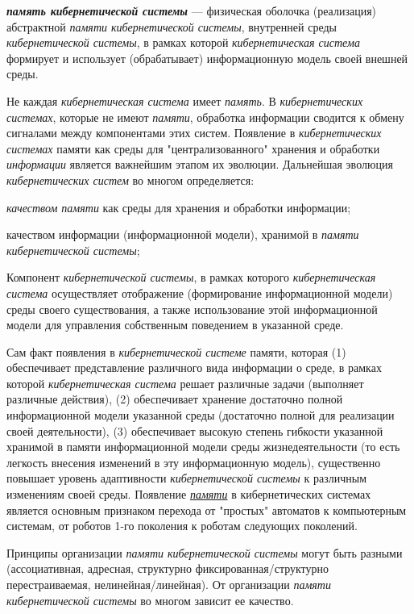 \textbf{\textit{память кибернетической системы}} --- физическая оболочка (реализация) абстрактной \textit{памяти кибернетической системы}, внутренней среды \textit{кибернетической системы}, в рамках которой \textit{кибернетическая система} формирует и использует (обрабатывает) информационную модель своей внешней среды.

Не каждая \textit{кибернетическая система} имеет \textit{память}. В \textit{кибернетических системах}, которые не имеют \textit{памяти}, обработка информации сводится к обмену сигналами между компонентами этих систем. Появление в \textit{кибернетических системах} памяти как среды для "централизованного"{} хранения и обработки \textit{информации} является важнейшим этапом их эволюции. Дальнейшая эволюция \textit{кибернетических систем} во многом определяется:
\begin{textitemize}
	\item \textit{качеством памяти} как среды для хранения и обработки информации;
	\item качеством информации (информационной модели), хранимой в \textit{памяти кибернетической системы};
\end{textitemize}

Компонент \textit{кибернетической системы}, в рамках которого \textit{кибернетическая система} осуществляет отображение (формирование информационной модели) среды своего существования, а также использование этой информационной модели для управления собственным поведением в указанной среде.

Сам факт появления в \textit{кибернетической системе} памяти, которая (1) обеспечивает представление различного вида информации о среде, в рамках которой \textit{кибернетическая система} решает различные задачи (выполняет различные действия), (2) обеспечивает хранение достаточно полной информационной модели указанной среды (достаточно полной для реализации своей деятельности), (3) обеспечивает высокую степень гибкости указанной хранимой в памяти информационной модели среды жизнедеятельности (то есть легкость внесения изменений в эту информационную модель), существенно повышает уровень адаптивности \textit{кибернетической системы} к различным изменениям своей среды.
Появление{} \uline{\textit{памяти}} в кибернетических системах является основным признаком перехода от "простых"{} автоматов к компьютерным системам, от роботов 1-го поколения к роботам следующих поколений.

Принципы организации \textit{памяти кибернетической системы} могут быть разными (ассоциативная, адресная, структурно фиксированная/структурно перестраиваемая, нелинейная/линейная). От организации \textit{памяти кибернетической системы} во многом зависит ее качество.

